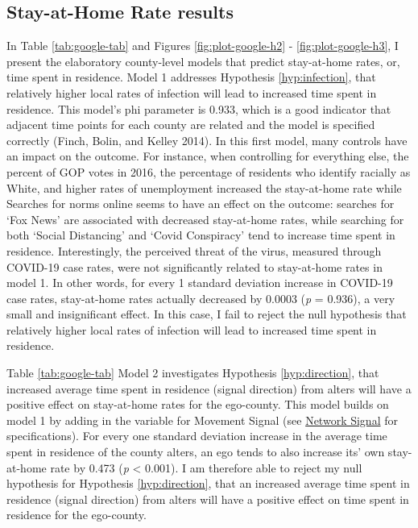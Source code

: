 \hypertarget{stay-at-home-rate-results}{%
\subsection{Stay-at-Home Rate results}\label{stay-at-home-rate-results}}




In Table \ref{tab:google-tab} and Figures \ref{fig:plot-google-h2} -
\ref{fig:plot-google-h3}, I present the elaboratory county-level models that
predict stay-at-home rates, or, time spent in residence. Model 1 addresses
Hypothesis \ref{hyp:infection}, that relatively higher local rates of infection
will lead to increased time spent in residence. This model's phi parameter is
0.933, which is a good indicator that adjacent time points for each county are
related and the model is specified correctly (Finch, Bolin, and Kelley 2014). In
this first model, many controls have an impact on the outcome. For instance,
when controlling for everything else, the percent of GOP votes in 2016, the
percentage of residents who identify racially as White, and higher rates of
unemployment increased the stay-at-home rate while Searches for norms online
seems to have an effect on the outcome: searches for `Fox News' are associated
with decreased stay-at-home rates, while searching for both `Social Distancing'
and `Covid Conspiracy' tend to increase time spent in residence. Interestingly,
the perceived threat of the virus, measured through COVID-19 case rates, were
not significantly related to stay-at-home rates in model 1. In other words, for
every 1 standard deviation increase in COVID-19 case rates, stay-at-home rates
actually decreased by 0.0003 (\emph{p} = 0.936), a very small and insignificant
effect. In this case, I fail to reject the null hypothesis that relatively
higher local rates of infection will lead to increased time spent in residence.

Table \ref{tab:google-tab} Model 2 investigates Hypothesis \ref{hyp:direction},
that increased average time spent in residence (signal direction) from alters
will have a positive effect on stay-at-home rates for the ego-county. This model
builds on model 1 by adding in the variable for Movement Signal (see
\protect\hyperlink{network-signal}{Network Signal} for specifications). For
every one standard deviation increase in the average time spent in residence of
the county alters, an ego tends to also increase its' own stay-at-home rate by
0.473 (\emph{p} \textless{} 0.001). I am therefore able to reject my null
hypothesis for Hypothesis \ref{hyp:direction}, that an increased average time
spent in residence (signal direction) from alters will have a positive effect on
time spent in residence for the ego-county.

